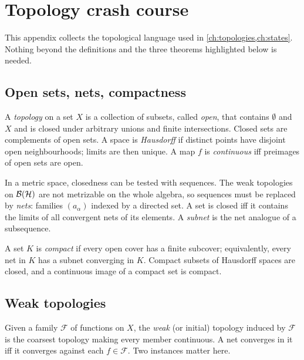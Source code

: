\chapter{Topology crash course}\label{app:topology}
This appendix collects the topological language used in \cref{ch:topologies,ch:states}. Nothing beyond the definitions and the three theorems highlighted below is needed.

\section{Open sets, nets, compactness}
A \emph{topology} on a set $X$ is a collection of subsets, called \emph{open}, that contains $\emptyset$ and $X$ and is closed under arbitrary unions and finite intersections. Closed sets are complements of open sets. A space is \emph{Hausdorff} if distinct points have disjoint open neighbourhoods; limits are then unique. A map $f$ is \emph{continuous} iff preimages of open sets are open.

In a metric space, closedness can be tested with sequences. The weak topologies on $\mathcal{B}(\mathcal{H})$ are not metrizable on the whole algebra, so sequences must be replaced by \emph{nets}: families $(a_\alpha)$ indexed by a directed set. A set is closed iff it contains the limits of all convergent nets of its elements. A \emph{subnet} is the net analogue of a subsequence.

A set $K$ is \emph{compact} if every open cover has a finite subcover; equivalently, every net in $K$ has a subnet converging in $K$. Compact subsets of Hausdorff spaces are closed, and a continuous image of a compact set is compact.

\section{Weak topologies}
Given a family $\mathcal F$ of functions on $X$, the \emph{weak} (or initial) topology induced by $\mathcal F$ is the coarsest topology making every member continuous. A net converges in it iff it converges against each $f\in\mathcal F$. Two instances matter here.

